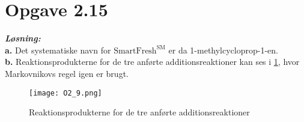 \documentclass{report}
\newcommand{\sol}{\setlength{\parindent}{0cm}\textbf{\textit{Løsning:}}\setlength{\parindent}{1cm}}
\begin{document}
\section*{Opgave 2.15}
\sol \\
\textbf{a.} 
Det systematiske navn for $\text{SmartFresh}^{\text{SM}}$ er da 1-methylcycloprop-1-en. \\[1ex]
\textbf{b.} Reaktionsprodukterne for de tre anførte additionsreaktioner kan ses i \cref{fig:9}, hvor Markovnikovs regel igen er brugt.
\begin{figure}[H]
\begin{center}
  \texttt{[image: O2\_9.png]}
\end{center}
\caption{Reaktionsprodukterne for de tre anførte additionsreaktioner}
\label{fig:9}
\end{figure}
\end{document}

